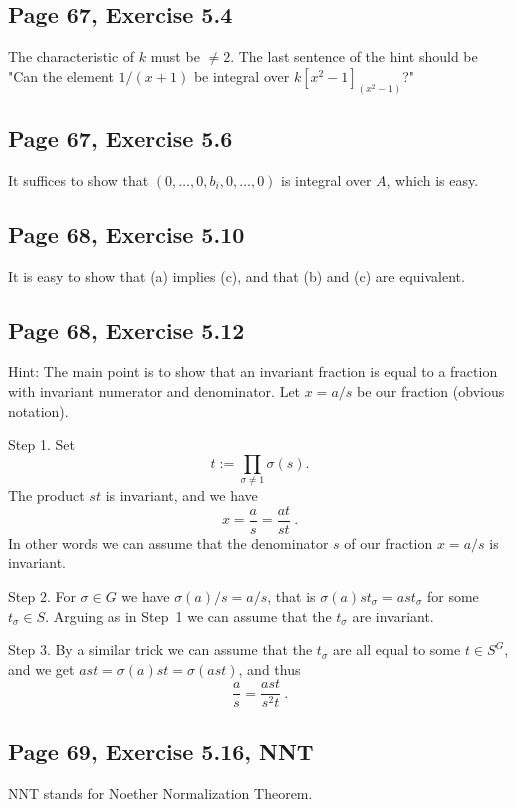 \documentclass[parskip=half,fontsize=12pt]{scrartcl}%
\begin{document}
\subsection{Page 67, Exercise 5.4}%

The characteristic of $k$ must be $\ne2$. The last sentence of the hint should be "Can the element $1/(x + 1)$ be integral over $k[x^2-1]_{(x^2-1)}$?"  

\subsection{Page 67, Exercise 5.6}%

It suffices to show that $(0,\dots,0,b_i,0,\dots,0)$ is integral over $A$, which is easy.

\subsection{Page 68, Exercise 5.10}%

It is easy to show that (a) implies (c), and that (b) and (c) are equivalent.

\subsection{Page 68, Exercise 5.12}%

Hint: The main point is to show that an invariant fraction is equal to a fraction with invariant numerator and denominator. Let $x=a/s$ be our fraction (obvious notation). 

Step 1. Set 
$$
t:=\prod_{\sigma\ne1}\sigma(s).
$$ 
The product $st$ is invariant, and we have 
$$
x=\frac{a}{s}=\frac{at}{st}\ .
$$ 
In other words we can assume that the denominator $s$ of our fraction $x=a/s$ is invariant.

Step 2. For $\sigma\in G$ we have $\sigma(a)/s=a/s$, that is $\sigma(a)st_\sigma=ast_\sigma$ for some $t_\sigma\in S$. Arguing as in Step~1 we can assume that the $t_\sigma$ are invariant.

Step 3. By a similar trick we can assume that the $t_\sigma$ are all equal to some $t\in S^G$, and we get $ast=\sigma(a)st=\sigma(ast)$, and thus 
$$
\frac{a}{s}=\frac{ast}{s^2t}\ .
$$

\subsection{Page 69, Exercise 5.16, NNT}\label{nnt}%

NNT stands for Noether Normalization Theorem.
\end{document}
